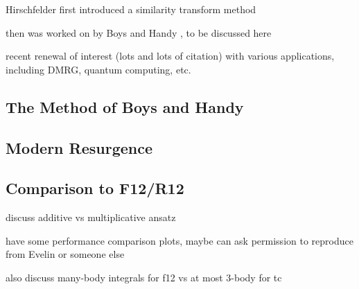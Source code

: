 Hirschfelder first introduced a similarity transform method \cite{hirschfelderRemoval1963}

then was worked on by Boys and Handy , to be discussed here

recent renewal of interest (lots and lots of citation) with various applications, including DMRG, quantum computing, etc.


\subsection{The Method of Boys and Handy}

\subsection{Modern Resurgence}

\subsection{Comparison to F12/R12}

discuss additive vs multiplicative ansatz

have some performance comparison plots, maybe can ask permission to reproduce from Evelin or someone else

also discuss many-body integrals for f12 vs at most 3-body for tc
